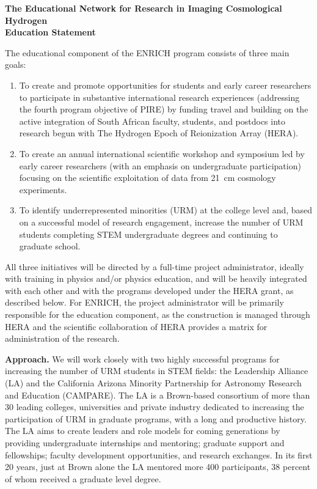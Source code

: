 \documentclass[preprint,11pt]{aastex}
\begin{document}
\clearpage
\setcounter{page}{1}

\setlength{\parindent}{0cm}
\textbf{\large The Educational Network for Research in Imaging Cosmological Hydrogen}\\
\textbf{Education Statement}
\vspace{6pt}
\setlength{\parindent}{17pt}

The educational component of the ENRICH program consists of three main goals:

\begin{enumerate}
\item To create and promote opportunities for students and early career researchers to participate in substantive international research experiences (addressing the fourth program objective of PIRE) by funding travel and building on the active integration of South African faculty, students, and postdocs into research begun with The Hydrogen Epoch of Reionization Array (HERA).

\item To create an annual international scientific workshop and symposium led by early career researchers (with an emphasis on undergraduate participation) focusing on the scientific exploitation of data from 21\, cm cosmology experiments.

\item To identify underrepresented minorities (URM) at the college level and, based on a successful model of research engagement, increase the number of URM students completing STEM undergraduate degrees and continuing to graduate school.
\end{enumerate}

All three initiatives will be directed by a full-time project administrator, ideally with training in physics and/or physics education, and will be heavily integrated with each other and with the programs developed under the HERA grant, as described below.  For ENRICH, the project administrator will be primarily responsible for the education component, as the construction is managed through HERA and the scientific collaboration of HERA provides a matrix for administration of the research.

\vspace{8pt}
\textbf{Approach.} We will work closely with two highly successful programs for increasing the number of URM students in STEM fields: the Leadership Alliance (LA) and the California Arizona Minority Partnership for Astronomy Research and Education (CAMPARE).
The LA is a Brown-based consortium of more than 30 leading colleges, universities and private industry dedicated to increasing the participation of URM in graduate programs, with a long and productive history.  The LA aims to create leaders and role models for coming generations by providing undergraduate internships and mentoring; graduate support and fellowships; faculty development opportunities, and research exchanges.  In its first 20 years, just at Brown alone the LA mentored more 400 participants, 38 percent of whom received a graduate level degree. 
\end{document}
